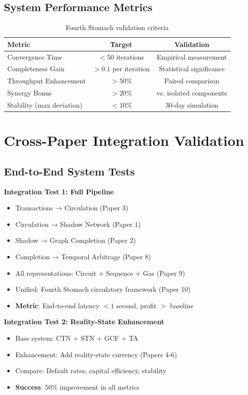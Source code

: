 \documentclass[12pt]{article}
\begin{document}
\subsection{System Performance Metrics}

\begin{table}[h]
\centering
\begin{tabular}{|l|c|c|}
\hline
Metric & Target & Validation \\
\hline
Convergence Time & $< 50$ iterations & Empirical measurement \\
Completeness Gain & $> 0.1$ per iteration & Statistical significance \\
Throughput Enhancement & $> 50\%$ & Paired comparison \\
Synergy Bonus & $> 20\%$ & vs. isolated components \\
Stability (max deviation) & $< 10\%$ & 30-day simulation \\
\hline
\end{tabular}
\caption{Fourth Stomach validation criteria}
\end{table}

\section{Cross-Paper Integration Validation}

\subsection{End-to-End System Tests}

\textbf{Integration Test 1: Full Pipeline}
\begin{itemize}
    \item Transactions → Circulation (Paper 3)
    \item Circulation → Shadow Network (Paper 1)
    \item Shadow → Graph Completion (Paper 2)
    \item Completion → Temporal Arbitrage (Paper 8)
    \item All representations: Circuit + Sequence + Gas (Paper 9)
    \item Unified: Fourth Stomach circulatory framework (Paper 10)
    \item \textbf{Metric}: End-to-end latency $< 1$ second, profit $>$ baseline
\end{itemize}

\textbf{Integration Test 2: Reality-State Enhancement}
\begin{itemize}
    \item Base system: CTN + STN + GCF + TA
    \item Enhancement: Add reality-state currency (Papers 4-6)
    \item Compare: Default rates, capital efficiency, stability
    \item \textbf{Success}: $50\%$ improvement in all metrics
\end{itemize}
\end{document}

